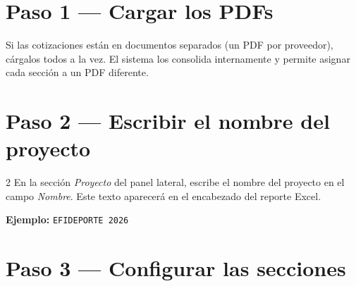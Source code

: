 \documentclass[12pt, a4paper, oneside]{report}
\newcommand{\btn}[1]{\texttt{\colorbox{vino!15}{\strut#1}}}
\newcommand{\campo}[1]{\textit{#1}}
\newcommand{\tecla}[1]{\textsf{\small\fbox{#1}}}
\begin{document}
\section{Paso 1 — Cargar los PDFs}


\begin{consejobox}
Si las cotizaciones están en documentos separados (un PDF por proveedor),
cárgalos todos a la vez. El sistema los consolida internamente y permite
asignar cada sección a un PDF diferente.
\end{consejobox}

\section{Paso 2 — Escribir el nombre del proyecto}

\begin{pasobox}{2}
En la sección \textit{Proyecto} del panel lateral, escribe el nombre del
proyecto en el campo \campo{Nombre}. Este texto aparecerá en el encabezado
del reporte Excel.

\textbf{Ejemplo:} \texttt{EFIDEPORTE 2026}
\end{pasobox}

\section{Paso 3 — Configurar las secciones}
\end{document}

